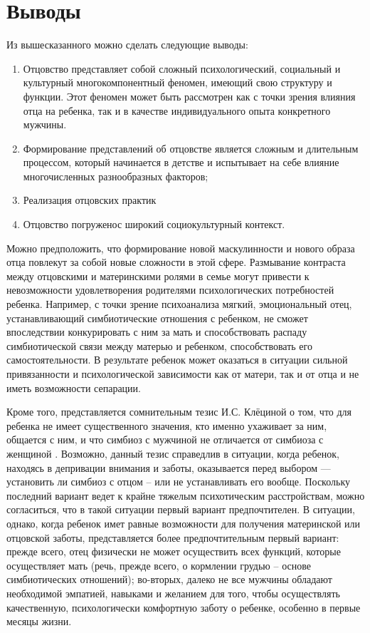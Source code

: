 \documentclass{../../common/thesisbyxetex}
\begin{document}
\section{Выводы}

Из вышесказанного можно сделать следующие выводы:

\begin{enumerate}
 \item Отцовство представляет собой сложный психологический, социальный и культурный  
многокомпонентный феномен, имеющий свою структуру и функции. Этот феномен может быть рассмотрен как 
с точки зрения влияния отца на ребенка, так и в качестве индивидуального опыта конкретного мужчины.
\item Формирование представлений об отцовстве является сложным и длительным процессом, который 
начинается в детстве и испытывает на себе влияние многочисленных разнообразных факторов;

  \item Реализация отцовских практик
  \item Отцовство погруженос широкий социокультурный контекст.
\end{enumerate}

Можно предположить, что формирование новой маскулинности и нового образа отца повлекут за собой
новые сложности в этой сфере. Размывание контраста между отцовскими и материнскими ролями в семье
могут привести к невозможности удовлетворения родителями психологических потребностей ребенка.
Например, с точки зрение психоанализа 	мягкий, эмоциональный отец, устанавливающий симбиотические
отношения с ребенком, не сможет впоследствии конкурировать с ним за мать и способствовать распаду
симбиотической связи между матерью и ребенком, способствовать его самостоятельности. В результате
ребенок может оказаться в ситуации сильной привязанности и психологической зависимости как от
матери, так и от отца и не иметь возможности сепарации.

Кроме того, представляется сомнительным тезис И.С. Клёциной о том, что для ребенка не имеет
существенного значения, кто именно ухаживает за ним, общается с ним, и что симбиоз с мужчиной не
отличается от симбиоза с женщиной \cite{clec}. Возможно, данный тезис справедлив в ситуации, когда
ребенок, находясь в депривации внимания и заботы, оказывается перед выбором --- установить ли
симбиоз с отцом -- или не устанавливать его вообще. Поскольку последний вариант ведет к крайне
тяжелым психотическим расстройствам, можно согласиться, что в такой ситуации первый вариант
предпочтителен. В ситуации, однако, когда ребенок имет равные возможности для получения материнской
или отцовской заботы, представляется более предпочтительным первый вариант: прежде всего, отец
физически не может осуществить всех функций, которые осуществляет мать (речь, прежде всего, о
кормлении грудью -- основе симбиотических отношений); во-вторых, далеко не все мужчины обладают
необходимой эмпатией, навыками и желанием для того, чтобы осуществлять качественную, психологически
комфортную заботу о
ребенке, особенно в первые месяцы жизни.
\end{document}
